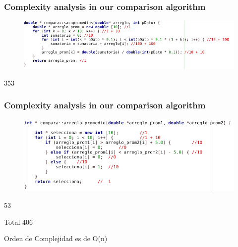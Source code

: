 \documentclass{beamer}
\begin{document}
\begin{frame}
\frametitle{Complexity analysis in our comparison algorithm}

\begin{figure}

\includegraphics[totalheight=2.4cm]{1.png}

\end{figure}

353


\end{frame}

\begin{frame}
\frametitle{Complexity analysis in our comparison algorithm}

\begin{figure}

\includegraphics[totalheight=3cm]{2.png}

\end{figure}

53

Total 406

Orden de Complejidad es de O(n)

\end{frame}
\end{document}
